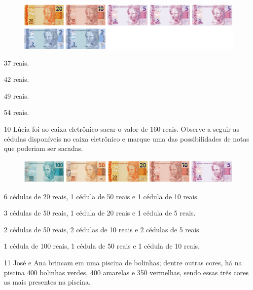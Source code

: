 \begin{figure}[H]
\includegraphics[width=\textwidth]{./media/image145.png}
\end{figure}

\begin{escolha}[itemsep=-5pt]
\item 37 reais.

\item 42 reais.

\item 49 reais.

\item 54 reais.
\end{escolha}

\num{10} Lúcia foi ao caixa eletrônico sacar o valor de 160 reais. Observe a seguir
as cédulas disponíveis no caixa eletrônico e marque uma das
possibilidades de notas que poderiam ser sacadas.

\begin{figure}[H]
\includegraphics[width=\textwidth]{./media/image146.png}
\end{figure}

\begin{escolha}[itemsep=-5pt]
\item 6 cédulas de 20 reais, 1 cédula de 50 reais e 1 cédula de 10 reais.

\item 3 cédulas de 50 reais, 1 cédula de 20 reais e 1 cédula de 5 reais.

\item 2 cédulas de 50 reais, 2 cédulas de 10 reais e 2 cédulas de 5 reais.

\item 1 cédula de 100 reais, 1 cédula de 50 reais e 1 cédula de 10 reais.
\end{escolha}

\num{11} José e Ana brincam em uma piscina de bolinhas; dentre outras cores, há
na piscina 400 bolinhas verdes, 400 amarelas e 350 vermelhas, sendo
essas três cores as mais presentes na piscina.

